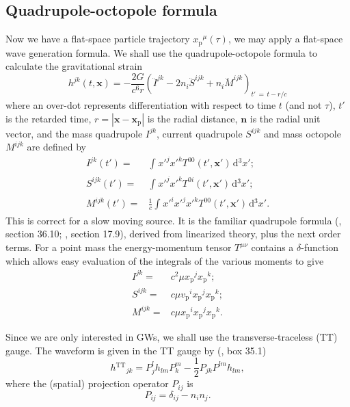 \documentclass[useAMS,usedcolumn,usegraphicx,usenatbib]{mn2e}
\newcommand{\sub}[1]{\ensuremath{_\mathrm{#1}}}
\newcommand{\super}[1]{\ensuremath{^\mathrm{#1}}}
\newcommand{\dd}{\ensuremath{\mathrm{d}}}
\newcommand{\intd}[4]{\ensuremath{\int_{#1}^{#2}{#3}\,\dd{#4}}}
\newcommand{\recip}[1]{\ensuremath{\frac{1}{#1}}}
\begin{document}
\subsection{Quadrupole-octopole formula}

Now we have a flat-space particle trajectory $x\sub{p}^\mu(\tau)$, we may apply a flat-space wave generation formula. We shall use the quadrupole-octopole formula to calculate the gravitational strain \citep{Bekenstein1973, Press1977}
\begin{equation}
h^{jk}(t, \boldsymbol{x}) = -\frac{2G}{c^6r}\left(\ddot{I}^{jk} - 2n_i\ddot{S}^{ijk} + n_i\dddot{M}^{ijk}\right)_{t'\, =\, t - r/c}
\label{eq:Octopole}
\end{equation}
where an over-dot represents differentiation with respect to time $t$ (and not $\tau$), $t'$ is the retarded time, $r = \left|\boldsymbol{x} - \boldsymbol{x}\sub{p}\right|$ is the radial distance, $\boldsymbol{n}$ is the radial unit vector, and the mass quadrupole ${I}^{jk}$, current quadrupole ${S}^{ijk}$ and mass octopole ${M}^{ijk}$ are defined by
\begin{align}
{I}^{jk}(t') = {} & \intd{}{}{{x'}^j{x'}^kT^{00}(t', \boldsymbol{x'})}{^3x'};\\
{S}^{ijk}(t') = {} & \intd{}{}{{x'}^j{x'}^kT^{0i}(t', \boldsymbol{x'})}{^3x'};\\
{M}^{ijk}(t') = {} & \recip{c}\intd{}{}{{x'}^i{x'}^j{x'}^kT^{00}(t', \boldsymbol{x'})}{^3x'}.
\end{align}
This is correct for a slow moving source. It is the familiar quadrupole formula (\citealt{Misner1973}, section 36.10; \citealt{Hobson2006}, section 17.9), derived from linearized theory, plus the next order terms. For a point mass the energy-momentum tensor $T^{\mu\nu}$ contains a $\delta$-function which allows easy evaluation of the integrals of the various moments to give
\begin{align}
{I}^{jk} = {} & c^2\mu x\sub{p}^jx\sub{p}^k;\\
{S}^{ijk} = {} & c\mu v\sub{p}^ix\sub{p}^jx\sub{p}^k;\\
{M}^{ijk} = {} & c\mu x\sub{p}^ix\sub{p}^jx\sub{p}^k.
\end{align}

Since we are only interested in GWs, we shall use the transverse-traceless (TT) gauge. The waveform is given in the TT gauge by (\citealt{Misner1973}, box 35.1)
\begin{equation}
h\super{TT}_{jk} = P^l_jh_{lm}P^m_k - \recip{2}P_{jk}P^{lm}h_{lm},
\end{equation}
where the (spatial) projection operator $P_{ij}$ is
\begin{equation}
P_{ij} = \delta_{ij} - n_in_j.
\end{equation}
\end{document}
